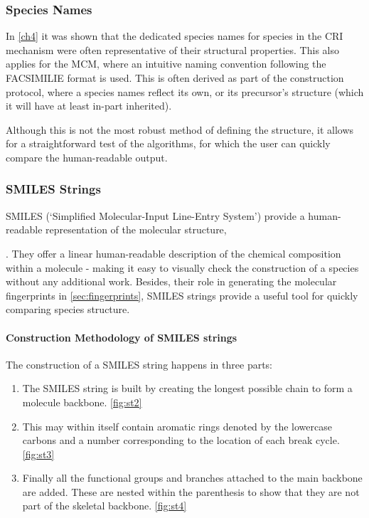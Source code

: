 \subsubsection{Species Names}
In \autoref{ch4} it was shown that the dedicated species names for species in the CRI mechanism were often representative of their structural properties. This also applies for the MCM, where an intuitive naming convention following the FACSIMILIE format is used. This is often derived as part of the construction protocol, where a species names reflect its own, or its precursor's structure (which it will have at least in-part inherited).

Although this is not the most robust method of defining the structure, it allows for a straightforward test of the algorithms, for which the user can quickly compare the human-readable output.


\subsubsection{SMILES Strings}\label{sec:SMILES}


 SMILES (`Simplified Molecular-Input Line-Entry System') provide a human-readable representation of the molecular structure,

 \citep{smiles}. They offer a linear human-readable description of the chemical composition within a molecule - making it easy to visually check the construction of a species without any additional work. Besides, their role in generating the molecular fingerprints in \autoref{sec:fingerprints}, SMILES strings provide a useful tool for quickly comparing species structure.

\paragraph*{Construction Methodology of SMILES strings}
The construction of a SMILES string happens in three parts:

\begin{enumerate}
    \item The SMILES string is built by creating the longest possible chain to form a molecule backbone.
    \autoref{fig:st2}

    \item This may within itself contain aromatic rings denoted by the lowercase carbons and a number corresponding to the location of each break cycle. \autoref{fig:st3}

    \item Finally all the functional groups and branches attached to the main backbone are added. These are nested within the parenthesis to show that they are not part of the skeletal backbone. \autoref{fig:st4}
\end{enumerate}




